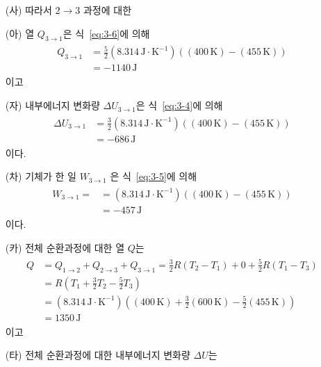 \documentclass[floatfix,nofootinbib,superscriptaddress,fleqn]{revtex4}
\begin{document}
  \begin{itemize}
  \item[(사)] 따라서 $2\to 3$ 과정에 대한
  \item[(아)] 열 $Q_{3\to 1}$은 식~\eqref{eq:3-6}에 의해
  \begin{align}
    \begin{split}
      Q_{3\to 1} &= \frac{5}{2}(8.314\,\mathrm{J\cdot K^{-1}})
      ((400\,\mathrm{K})-(455\,\mathrm{K})) \\
      &= -1140\,\mathrm{J}
    \end{split}
  \end{align} 
  이고
  \item[(자)] 내부에너지 변화량 $\Delta U_{3\to 1}$은 식~\eqref{eq:3-4}에 의해
  \begin{align}
    \begin{split}
      \Delta U_{3\to 1} &= \frac{3}{2}(8.314\,\mathrm{J\cdot K^{-1}})
      ((400\,\mathrm{K})-(455\,\mathrm{K})) \\
      &= -686\,\mathrm{J}
    \end{split}
  \end{align}
  이다.
  \item[(차)] 기체가 한 일 $W_{3\to 1} $ 은 식~\eqref{eq:3-5}에 의해
  \begin{align}
    \begin{split}
      W_{3\to 1} = &= (8.314\,\mathrm{J\cdot K^{-1}})
      ((400\,\mathrm{K})-(455\,\mathrm{K})) \\
      &= -457\,\mathrm{J}
    \end{split}
  \end{align}
  이다.
  \item[(카)] 
  전체 순환과정에 대한 열 $Q$는
  \begin{align}
    \begin{split}
      Q &= Q_{1\to 2}+Q_{2\to 3}+Q_{3\to 1}
      =\frac{3}{2}R(T_2-T_1)+0+\frac{5}{2}R(T_1-T_3) \\
      &= R\left(T_1 + \frac{3}{2}T_2 - \frac{5}{2}T_3\right)  \\
      &= (8.314\,\mathrm{J\cdot K^{-1}})
      \left((400\,\mathrm{K}) + \frac{3}{2}(600\,\mathrm{K}) 
      - \frac{5}{2}(455\,\mathrm{K})\right)  \\
      &=1350\,\mathrm{J}
    \end{split}
  \end{align}
  이고
  \item[(타)] 
  전체 순환과정에 대한 내부에너지 변화량 $\Delta U$는
  \begin{align}

\end{align}
\end{itemize}
\end{document}
